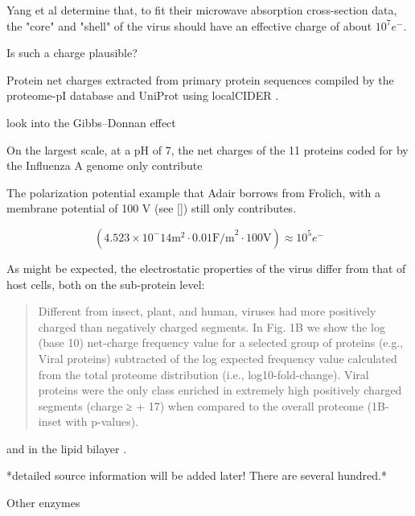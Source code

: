 \documentclass[paper.tex]{subfiles}
\begin{document}
Yang et al determine that, to fit their microwave absorption cross-section data, the "core" and "shell" of the virus should have an effective charge of about $10^7 e^-$. 

Is such a charge plausible?

Protein net charges extracted from primary protein sequences compiled by the proteome-pI database \cite{ProteomepI2017} and UniProt using localCIDER \cite{CIDER2017} . 


look into the Gibbs–Donnan effect


On the largest scale, at a pH of 7, the net charges of the 11 proteins coded for by the Influenza A genome only contribute 


The polarization potential example that Adair borrows from Frolich, with a membrane potential of 100 V (see []) still only contributes.  

$$(4.523 \times 10^-14 \text{m}^2 \cdot 0.01 \text{F/m}^2 \cdot 100 \text{V}) \approx 10^5 e^- $$




As might be expected, the electrostatic properties of the virus differ from that of host cells, both \cite{Icosahedral2019} on the sub-protein level:

\begin{quote}
	Different from insect, plant, and human, viruses had more positively charged than negatively charged segments. In Fig. 1B we show the log (base 10) net-charge frequency value for a selected group of proteins (e.g., Viral proteins) subtracted of the log expected frequency value calculated from the total proteome distribution (i.e., log10-fold-change). Viral proteins were the only class enriched in extremely high positively charged segments (charge ≥ + 17) when compared to the overall proteome (1B-inset with p-values).
\end{quote}

and in the lipid bilayer \cite{Lipid2015} \footnotemark.


*detailed source information will be added later! There are several hundred.*



Other enzymes
\end{document}
